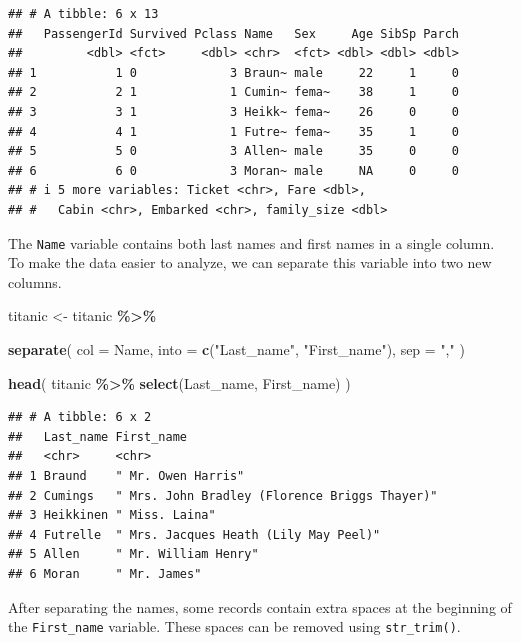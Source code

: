 \documentclass[
  11pt,
  oneside]{book}
\newenvironment{Shaded}{\begin{snugshade}}{\end{snugshade}}
\newcommand{\AttributeTok}[1]{\textcolor[rgb]{0.13,0.29,0.53}{#1}}
\newcommand{\FunctionTok}[1]{\textcolor[rgb]{0.13,0.29,0.53}{\textbf{#1}}}
\newcommand{\NormalTok}[1]{#1}
\newcommand{\OtherTok}[1]{\textcolor[rgb]{0.56,0.35,0.01}{#1}}
\newcommand{\SpecialCharTok}[1]{\textcolor[rgb]{0.81,0.36,0.00}{\textbf{#1}}}
\newcommand{\StringTok}[1]{\textcolor[rgb]{0.31,0.60,0.02}{#1}}
\begin{document}
\begin{verbatim}
## # A tibble: 6 x 13
##   PassengerId Survived Pclass Name   Sex     Age SibSp Parch
##         <dbl> <fct>     <dbl> <chr>  <fct> <dbl> <dbl> <dbl>
## 1           1 0             3 Braun~ male     22     1     0
## 2           2 1             1 Cumin~ fema~    38     1     0
## 3           3 1             3 Heikk~ fema~    26     0     0
## 4           4 1             1 Futre~ fema~    35     1     0
## 5           5 0             3 Allen~ male     35     0     0
## 6           6 0             3 Moran~ male     NA     0     0
## # i 5 more variables: Ticket <chr>, Fare <dbl>,
## #   Cabin <chr>, Embarked <chr>, family_size <dbl>
\end{verbatim}

The \texttt{Name} variable contains both last names and first names in a single column. To make the data easier to analyze, we can separate this variable into two new columns.

\begin{Shaded}
\begin{Highlighting}[]
\NormalTok{titanic }\OtherTok{\textless{}{-}}\NormalTok{ titanic }\SpecialCharTok{\%\textgreater{}\%}
  
  \FunctionTok{separate}\NormalTok{(}
    \AttributeTok{col =}\NormalTok{ Name,}
    \AttributeTok{into =} \FunctionTok{c}\NormalTok{(}\StringTok{"Last\_name"}\NormalTok{, }\StringTok{"First\_name"}\NormalTok{),}
    \AttributeTok{sep =} \StringTok{","}
\NormalTok{  )}

\FunctionTok{head}\NormalTok{(}
\NormalTok{  titanic }\SpecialCharTok{\%\textgreater{}\%}
    \FunctionTok{select}\NormalTok{(Last\_name, First\_name)}
\NormalTok{)}
\end{Highlighting}
\end{Shaded}

\begin{verbatim}
## # A tibble: 6 x 2
##   Last_name First_name                                   
##   <chr>     <chr>                                        
## 1 Braund    " Mr. Owen Harris"                           
## 2 Cumings   " Mrs. John Bradley (Florence Briggs Thayer)"
## 3 Heikkinen " Miss. Laina"                               
## 4 Futrelle  " Mrs. Jacques Heath (Lily May Peel)"        
## 5 Allen     " Mr. William Henry"                         
## 6 Moran     " Mr. James"
\end{verbatim}

After separating the names, some records contain extra spaces at the beginning of the \texttt{First\_name} variable. These spaces can be removed using \texttt{str\_trim()}.
\end{document}
